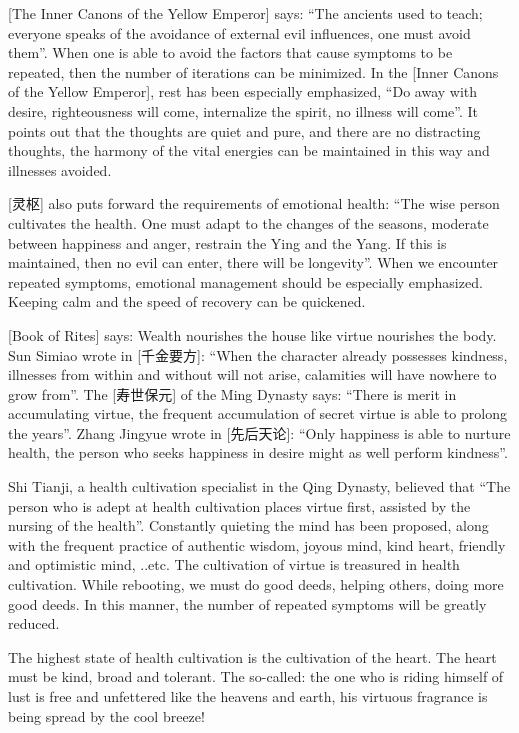 \documentclass[
]{book}
\begin{document}
{[}The Inner Canons of the Yellow Emperor{]} says: ``The ancients used to teach; everyone speaks of the avoidance of external evil influences, one must avoid them''. When one is able to avoid the factors that cause symptoms to be repeated, then the number of iterations can be minimized. In the {[}Inner Canons of the Yellow Emperor{]}, rest has been especially emphasized, ``Do away with desire, righteousness will come, internalize the spirit, no illness will come''. It points out that the thoughts are quiet and pure, and there are no distracting thoughts, the harmony of the vital energies can be maintained in this way and illnesses avoided.

{[}灵枢{]} also puts forward the requirements of emotional health: ``The wise person cultivates the health. One must adapt to the changes of the seasons, moderate between happiness and anger, restrain the Ying and the Yang. If this is maintained, then no evil can enter, there will be longevity''. When we encounter repeated symptoms, emotional management should be especially emphasized. Keeping calm and the speed of recovery can be quickened.

{[}Book of Rites{]} says: Wealth nourishes the house like virtue nourishes the body. Sun Simiao wrote in {[}千金要方{]}: ``When the character already possesses kindness, illnesses from within and without will not arise, calamities will have nowhere to grow from''. The {[}寿世保元{]} of the Ming Dynasty says: ``There is merit in accumulating virtue, the frequent accumulation of secret virtue is able to prolong the years''. Zhang Jingyue wrote in {[}先后天论{]}: ``Only happiness is able to nurture health, the person who seeks happiness in desire might as well perform kindness''.

Shi Tianji, a health cultivation specialist in the Qing Dynasty, believed that ``The person who is adept at health cultivation places virtue first, assisted by the nursing of the health''. Constantly quieting the mind has been proposed, along with the frequent practice of authentic wisdom, joyous mind, kind heart, friendly and optimistic mind, ..etc. The cultivation of virtue is treasured in health cultivation. While rebooting, we must do good deeds, helping others, doing more good deeds. In this manner, the number of repeated symptoms will be greatly reduced.

The highest state of health cultivation is the cultivation of the heart. The heart must be kind, broad and tolerant. The so-called: the one who is riding himself of lust is free and unfettered like the heavens and earth, his virtuous fragrance is being spread by the cool breeze!
\end{document}
